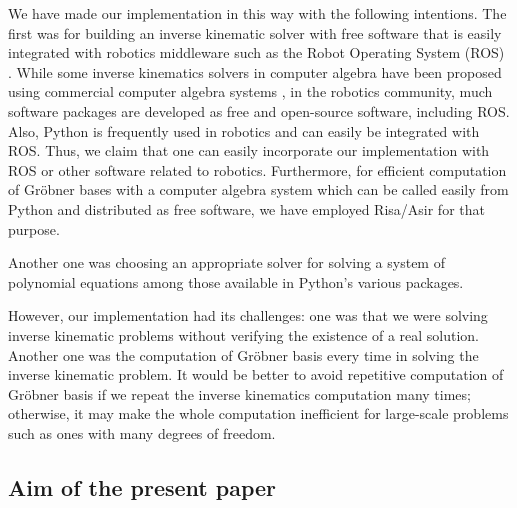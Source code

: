 \documentclass{birkjour}
\theoremstyle{plain}
\theoremstyle{definition}
\begin{document}
    We have made our implementation in this way with the following intentions. The first was for building an inverse kinematic solver with free software that is easily integrated with robotics middleware such as the Robot Operating System (ROS) \cite{ros-complete}.
    While some inverse kinematics solvers in computer algebra have been proposed using commercial computer algebra systems
    \cite{cha-mor-rou-wen2020,kaw-shi1999,net-spo1994,pit-hil-ste-max-koc2008,war2007},
    in the robotics community, much software packages are developed as free and open-source software, including ROS. Also, Python is frequently used in robotics and can easily be integrated with ROS. 
    Thus, we claim that one can easily incorporate our implementation with ROS or other software related to robotics. 
    Furthermore, for efficient computation of Gr\"obner bases with a computer algebra system 
    which can be called easily from Python and 
    distributed as free software, we have employed Risa/Asir for that purpose.

    Another one was choosing an appropriate solver for solving a system of polynomial equations among those available in Python's various packages.
    

    
    However, our implementation had its challenges: one was that 
    we were solving inverse kinematic problems without verifying the existence of a real solution. Another one was the computation of Gr\"obner basis 
    every time in solving the inverse kinematic problem.
    It would be better to avoid repetitive computation of Gr\"obner basis
    if we repeat the inverse kinematics computation many times;
    otherwise, it may make the whole computation inefficient for 
    large-scale problems such as ones with many degrees of freedom.

    \subsection{Aim of the present paper}
\end{document}
